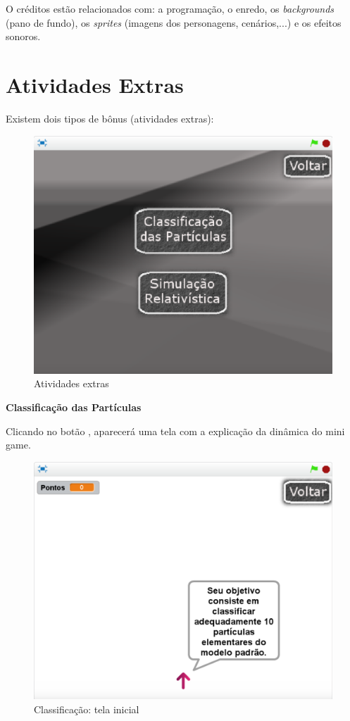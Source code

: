\documentclass[12pt,fleqn]{book} %
\begin{document}
O créditos estão relacionados com: a programação, o enredo, os \textit{backgrounds} (pano de fundo), os \textit{sprites} (imagens dos personagens, cenários,...) e os efeitos sonoros.

\newpage

\section{Atividades Extras}

Existem dois tipos de bônus (atividades extras):

\begin{figure}[h]
	\centering
	\includegraphics[width=0.65 \textwidth]{Produto/extras}
	\caption{Atividades extras}
	\label{fig:app_a:extras}
\end{figure}


\textbf{Classificação das Partículas}

Clicando no botão , aparecerá uma tela com a explicação da dinâmica do mini game.

\begin{figure}[h]
	\centering
	\includegraphics[width=0.65 \textwidth]{Produto/class1}
	\caption{Classificação: tela inicial}
	\label{fig:app_a:class1}
\end{figure}
\end{document}
